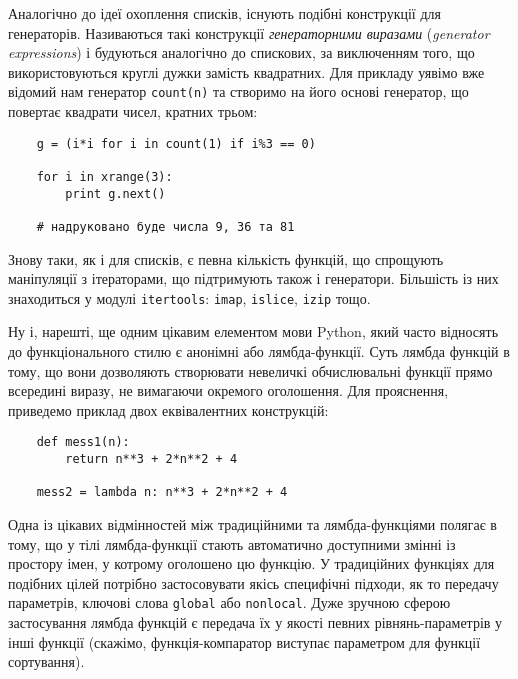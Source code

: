 \documentclass[a4paper, 12pt, onsedie]{article}
\begin{document}
    Аналогічно до ідеї охоплення списків, існують подібні конструкції для
    генераторів. Називаються такі конструкції \emph{генераторними виразами} 
    (\emph{generator expressions}) і будуються аналогічно до спискових, за
    виключенням того, що використовуються круглі дужки замість квадратних.
    Для прикладу уявімо вже відомий нам генератор \texttt{count(n)} та 
    створимо на його основі генератор, що повертає квадрати чисел, кратних
    трьом:
    \begin{verbatim}
    g = (i*i for i in count(1) if i%3 == 0)

    for i in xrange(3): 
        print g.next()

    # надруковано буде числа 9, 36 та 81
    \end{verbatim}

    Знову таки, як і для списків, є певна кількість функцій, що спрощують
    маніпуляції з ітераторами, що підтримують також і генератори. 
    Більшість із них знаходиться у модулі \texttt{itertools}:
    \texttt{imap}, \texttt{islice}, \texttt{izip} тощо.

    Ну і, нарешті, ще одним цікавим елементом мови Python, який часто відносять до 
    функціонального стилю є анонімні або лямбда-функції. Суть лямбда функцій в тому,
    що вони дозволяють створювати невеличкі обчислювальні функції прямо всередині виразу,
    не вимагаючи окремого оголошення. Для прояснення, приведемо приклад двох еквівалентних
    конструкцій:
    \begin{verbatim}
    def mess1(n):
        return n**3 + 2*n**2 + 4
    
    mess2 = lambda n: n**3 + 2*n**2 + 4
    \end{verbatim}
    Одна із цікавих відмінностей між традиційними та лямбда-функціями полягає в тому, що у тілі
    лямбда-функції стають автоматично доступними змінні із простору імен, у котрому оголошено
    цю функцію. У традиційних функціях для подібних цілей потрібно застосовувати якісь
    специфічні підходи, як то передачу параметрів, ключові слова \texttt{global} або 
    \texttt{nonlocal}. Дуже зручною сферою застосування лямбда функцій є передача їх у якості
    певних рівнянь-параметрів у інші функції (скажімо, функція-компаратор виступає параметром
    для функції сортування).
\end{document}
